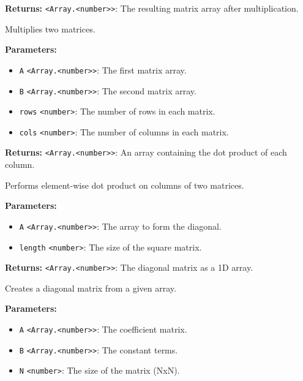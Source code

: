 \documentclass[12pt,a4paper]{article}
\begin{document}
\noindent \textbf{Returns:} \texttt{<Array.<number>>}: The resulting matrix array after multiplication.

\noindent Multiplies two matrices.

\vspace{5mm}
\noindent {}


\noindent \textbf{Parameters:}
\begin{itemize}
  \item \texttt{A} \texttt{<Array.<number>>}: The first matrix array.
  \item \texttt{B} \texttt{<Array.<number>>}: The second matrix array.
  \item \texttt{rows} \texttt{<number>}: The number of rows in each matrix.
  \item \texttt{cols} \texttt{<number>}: The number of columns in each matrix.
\end{itemize}

\noindent \textbf{Returns:} \texttt{<Array.<number>>}: An array containing the dot product of each column.

\noindent Performs element-wise dot product on columns of two matrices.

\vspace{5mm}
\noindent {}


\noindent \textbf{Parameters:}
\begin{itemize}
  \item \texttt{A} \texttt{<Array.<number>>}: The array to form the diagonal.
  \item \texttt{length} \texttt{<number>}: The size of the square matrix.
\end{itemize}

\noindent \textbf{Returns:} \texttt{<Array.<number>>}: The diagonal matrix as a 1D array.

\noindent Creates a diagonal matrix from a given array.

\vspace{5mm}
\noindent {}


\noindent \textbf{Parameters:}
\begin{itemize}
  \item \texttt{A} \texttt{<Array.<number>>}: The coefficient matrix.
  \item \texttt{B} \texttt{<Array.<number>>}: The constant terms.
  \item \texttt{N} \texttt{<number>}: The size of the matrix (NxN).
\end{itemize}
\end{document}

